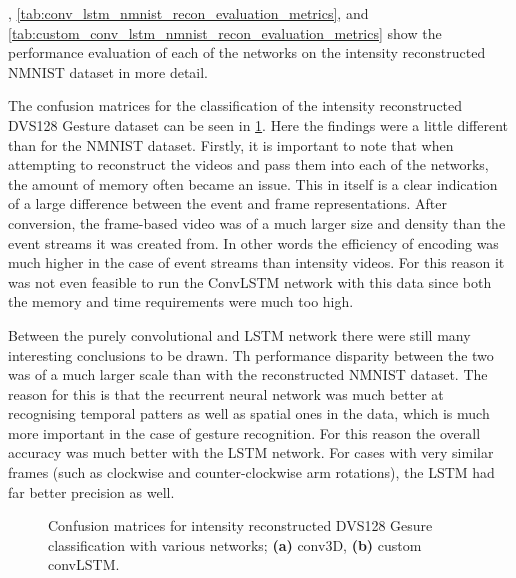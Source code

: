 , \cref{tab:conv_lstm_nmnist_recon_evaluation_metrics}, and \cref{tab:custom_conv_lstm_nmnist_recon_evaluation_metrics} show the performance evaluation of each of the networks on the intensity reconstructed NMNIST dataset in more detail.

\vspace{10pt}

The confusion matrices for the classification of the intensity reconstructed DVS128 Gesture dataset can be seen in \cref{fig:dvs128_recon_c_matrices}. Here the findings were a little different than for the NMNIST dataset. Firstly, it is important to note that when attempting to reconstruct the videos and pass them into each of the networks, the amount of memory often became an issue. This in itself is a clear indication of a large difference between the event and frame representations. After conversion, the frame-based video was of a much larger size and density than the event streams it was created from. In other words the efficiency of encoding was much higher in the case of event streams than intensity videos. For this reason it was not even feasible to run the ConvLSTM network with this data since both the memory and time requirements were much too high.

Between the purely convolutional and LSTM network there were still many interesting conclusions to be drawn. Th performance disparity between the two was of a much larger scale than with the reconstructed NMNIST dataset. The reason for this is that the recurrent neural network was much better at recognising temporal patters as well as spatial ones in the data, which is much more important in the case of gesture recognition. For this reason the overall accuracy was much better with the LSTM network. For cases with very similar frames (such as clockwise and counter-clockwise arm rotations), the LSTM had far better precision as well.

\begin{figure}[htb]%
    \centering
    \qquad
    \caption{Confusion matrices for intensity reconstructed  DVS128 Gesure classification with various networks; \textbf{(a)} conv3D, \textbf{(b)} custom convLSTM.}%
    \label{fig:dvs128_recon_c_matrices}%
\end{figure}

